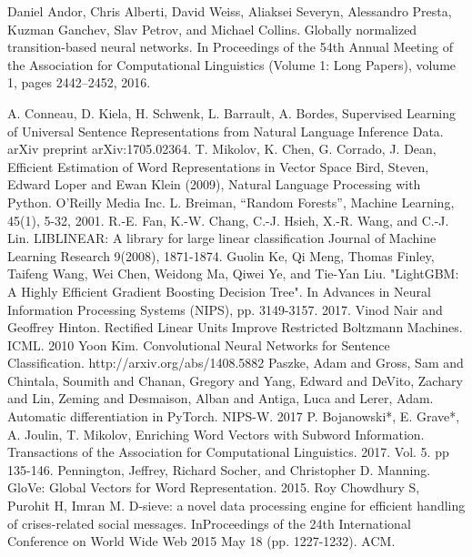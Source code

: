 \documentclass[unicode, 12pt, a4paper,oneside]{article}
\begin{document}
	
	\begin{thebibliography}{10}

		 Daniel Andor, Chris Alberti, David Weiss, Aliaksei Severyn, Alessandro Presta, Kuzman Ganchev, Slav Petrov, and Michael Collins. Globally normalized transition-based neural networks. In Proceedings of the 54th Annual Meeting of the Association for Computational Linguistics (Volume 1: Long Papers), volume 1, pages 2442–2452, 2016.
		
		 A. Conneau, D. Kiela, H. Schwenk, L. Barrault, A. Bordes, Supervised Learning of Universal Sentence Representations from Natural Language Inference Data. arXiv preprint arXiv:1705.02364.
		 T. Mikolov, K. Chen, G. Corrado, J. Dean, Efficient Estimation of Word Representations in Vector Space
		 Bird, Steven, Edward Loper and Ewan Klein (2009), Natural Language Processing with Python. O’Reilly Media Inc.
		 L. Breiman, “Random Forests”, Machine Learning, 45(1), 5-32, 2001.
		 R.-E. Fan, K.-W. Chang, C.-J. Hsieh, X.-R. Wang, and C.-J. Lin. LIBLINEAR: A library for large linear classification Journal of Machine Learning Research 9(2008), 1871-1874.
		 Guolin Ke, Qi Meng, Thomas Finley, Taifeng Wang, Wei Chen, Weidong Ma, Qiwei Ye, and Tie-Yan Liu. "LightGBM: A Highly Efficient Gradient Boosting Decision Tree". In Advances in Neural Information Processing Systems (NIPS), pp. 3149-3157. 2017.
		 Vinod Nair and Geoffrey Hinton. Rectified Linear Units Improve Restricted Boltzmann Machines. ICML. 2010
		 Yoon Kim. Convolutional Neural Networks for Sentence Classification. http://arxiv.org/abs/1408.5882
		 Paszke, Adam and Gross, Sam and Chintala, Soumith and Chanan, Gregory and Yang, Edward and DeVito, Zachary and Lin, Zeming and Desmaison, Alban and Antiga, Luca and Lerer, Adam. Automatic differentiation in PyTorch. NIPS-W. 2017
		 P. Bojanowski*, E. Grave*, A. Joulin, T. Mikolov, Enriching Word Vectors with Subword Information. Transactions of the Association for Computational Linguistics. 2017. Vol. 5. pp 135-146.
		 Pennington, Jeffrey, Richard Socher, and Christopher D. Manning. GloVe: Global Vectors for Word Representation. 2015.
		 Roy Chowdhury S, Purohit H, Imran M. D-sieve: a novel data processing engine for efficient handling of crises-related social messages. InProceedings of the 24th International Conference on World Wide Web 2015 May 18 (pp. 1227-1232). ACM.

\end{thebibliography}
\end{document}
